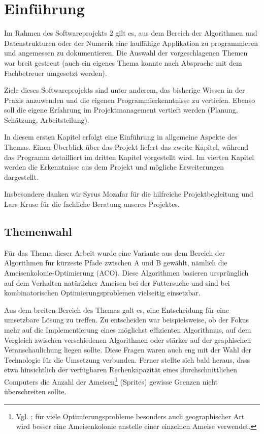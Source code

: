 

\chapter{Einführung}

Im Rahmen des Softwareprojekts 2 gilt es, aus dem Bereich der Algorithmen und
Datenstrukturen oder der Numerik eine lauffähige Applikation zu programmieren
und angemessen zu dokumentieren. Die Auswahl der vorgeschlagenen Themen war
breit gestreut (auch ein eigenes Thema konnte nach Absprache mit dem
Fachbetreuer umgesetzt werden).

Ziele dieses Softwareprojekts sind unter anderem, das bisherige Wissen in der
Praxis anzuwenden und die eigenen Programmierkenntnisse zu vertiefen. Ebenso
soll die eigene Erfahrung im Projektmanagement vertieft werden (Planung, 
Schätzung, Arbeitsteilung).

In diesem ersten Kapitel erfolgt eine Einführung in allgemeine Aspekte des
Themas. Einen Überblick über das Projekt liefert das zweite Kapitel, während das
Programm detailliert im dritten Kapitel vorgestellt wird. Im vierten Kapitel
werden die Erkenntnisse aus dem Projekt und mögliche Erweiterungen dargestellt.

Insbesondere danken wir Syrus Mozafar für die hilfreiche
Projektbegleitung und Lars Kruse für die fachliche Beratung unseres Projektes.




\section{Themenwahl}

Für das Thema dieser Arbeit wurde eine Variante aus dem Bereich der Algorithmen
für kürzeste Pfade zwischen A und B gewählt, nämlich die
Ameisenkolonie-Optimierung (ACO). Diese Algorithmen basieren ursprünglich auf
dem Verhalten natürlicher Ameisen bei der Futtersuche und sind bei
kombinatorischen Optimierungsproblemen vielseitig einsetzbar.

Aus dem breiten Bereich des Themas galt es, eine Entscheidung für eine
umsetzbare Lösung zu treffen. Zu entscheiden war beispielsweise, ob der Fokus
mehr auf die Implementierung eines möglichst effizienten Algorithmus, auf dem
Vergleich zwischen verschiedenen Algorithmen oder stärker auf der graphischen
Veranschaulichung liegen sollte. Diese Fragen waren auch eng mit der Wahl der
Technologie für die Umsetzung verbunden. Ferner stellte sich bald heraus, dass
etwa hinsichtlich der verfügbaren Rechenkapazität eines durchschnittlichen
Computers die Anzahl der Ameisen\footnote{Vgl. \citet*[S. 217]{ds-ant}; für
viele Optimierungsprobleme besonders auch geographischer Art wird besser eine
Ameisenkolonie anstelle einer einzelnen Ameise verwendet.} (Sprites) gewisse
Grenzen nicht überschreiten sollte.

